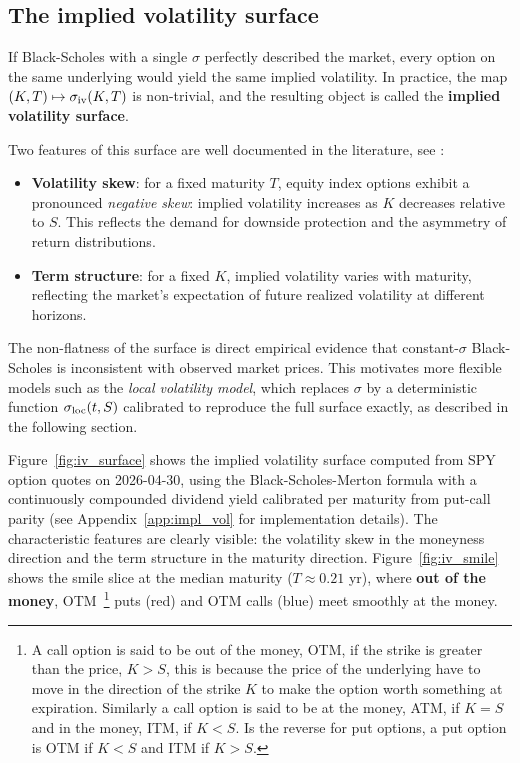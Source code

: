 \subsection{The implied volatility surface}\label{sec:impl_vol_surface}

If Black-Scholes with a single $\sigma$ perfectly described the market,
every option on the same underlying would yield the same implied volatility.
In practice, the map $(K, T) \mapsto \sigma_{\mathrm{iv}}(K, T)$ is non-trivial,
and the resulting object is called the \textbf{implied volatility surface}.

Two features of this surface are well documented in the literature, see \cite{derman_vol_smile}:
\begin{itemize}
    \item \textbf{Volatility skew}: for a fixed maturity $T$,
          equity index options exhibit a pronounced \textit{negative skew}:
          implied volatility increases as $K$ decreases relative to $S$.
          This reflects the demand for downside protection and the asymmetry of return distributions.
    \item \textbf{Term structure}: for a fixed $K$,
          implied volatility varies with maturity,
          reflecting the market's expectation of future realized volatility at different horizons.
\end{itemize}

The non-flatness of the surface is direct empirical evidence that constant-$\sigma$ Black-Scholes
is inconsistent with observed market prices.
This motivates more flexible models such as the \textit{local volatility model},
which replaces $\sigma$ by a deterministic function $\sigma_{\mathrm{loc}}(t, S)$ calibrated to reproduce the full surface exactly,
as described in the following section.

Figure~\ref{fig:iv_surface} shows the implied volatility surface computed from SPY option quotes
on 2026-04-30, using the Black-Scholes-Merton formula with a continuously compounded dividend yield
calibrated per maturity from put-call parity (see Appendix~\ref{app:impl_vol} for implementation details).
The characteristic features are clearly visible: the volatility skew in the moneyness direction
and the term structure in the maturity direction.
Figure~\ref{fig:iv_smile} shows the smile slice at the median maturity ($T \approx 0.21$ yr),
where \textbf{out of the money}, OTM~\footnote{
    A call option is said to be out of the money, OTM,
    if the strike is greater than the price, $K > S$,
    this is because the price of the underlying have to move in the direction of the strike $K$ to make the option worth something at expiration.
    Similarly a call option is said to be at the money, ATM,
    if $K = S$ and in the money, ITM, if $K < S$.
    Is the reverse for put options,
    a put option is OTM if $K < S$ and ITM if $K > S$.
}
puts (red) and OTM calls (blue) meet smoothly at the money.

